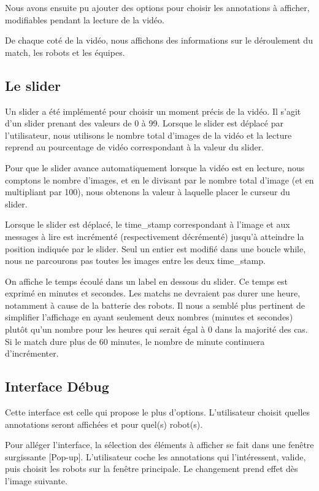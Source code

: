 Nous avons ensuite pu ajouter des options pour choisir les annotations à afficher, modifiables pendant la lecture de la vidéo. 
\bigskip

De chaque coté de la vidéo, nous affichons des informations sur le déroulement du match, les robots et les équipes.
\bigskip

\subsection{Le slider}

Un slider a été implémenté pour choisir un moment précis de la vidéo. Il s'agit d'un slider prenant des valeurs de 0 à 99. Lorsque le slider est déplacé par l'utilisateur, nous utilisons le nombre total d'images de la vidéo et la lecture reprend au pourcentage de vidéo correspondant à la valeur du slider. 
\bigskip

Pour que le slider avance automatiquement lorsque la vidéo est en lecture, nous comptons le nombre d'images, et en le divisant par le nombre total d'image (et en multipliant par 100), nous obtenons la valeur à laquelle placer le curseur du slider. 
\bigskip

Lorsque le slider est déplacé, le time\_stamp correspondant à l'image et aux messages à lire est incrémenté (respectivement décrémenté) jusqu'à atteindre la position indiquée par le slider. Seul un entier est modifié dans une boucle while, nous ne parcourons pas toutes les images entre les deux time\_stamp. 
\bigskip

On affiche le temps écoulé dans un label en dessous du slider. Ce temps est exprimé en minutes et secondes. Les matchs ne devraient pas durer une heure, notamment à cause de la batterie des robots. Il nous a semblé plus pertinent de simplifier l'affichage en ayant seulement deux nombres (minutes et secondes) plutôt qu'un nombre pour les heures qui serait égal à 0 dans la majorité des cas. Si le match dure plus de 60 minutes, le nombre de minute continuera d'incrémenter. 
\bigskip

\subsection{Interface Débug}
Cette interface est celle qui propose le plus d'options. L'utilisateur choisit quelles annotations seront affichées et pour quel(s) robot(s). 
\bigskip

Pour alléger l'interface, la sélection des éléments à afficher se fait dans une fenêtre surgissante [Pop-up]. L'utilisateur coche les annotations qui l'intéressent, valide, puis choisit les robots sur la fenêtre principale. Le changement prend effet dès l'image suivante.  
